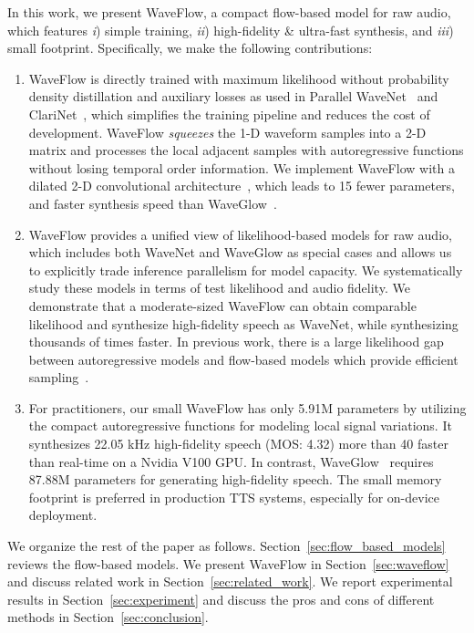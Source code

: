 \documentclass{article}
\begin{document}
In this work, we present WaveFlow, a compact flow-based model for raw audio, which features \emph{i}) simple training, \emph{ii}) high-fidelity \& ultra-fast synthesis, and \emph{iii}) small footprint. 
Specifically, we make the following contributions:
\vspace{-0.3em}
\begin{enumerate}[itemsep=-0.00pt, topsep=0pt, leftmargin=1.5em]
    \item WaveFlow is directly trained with maximum likelihood without probability density distillation and auxiliary losses as used in Parallel WaveNet~\citep{oord2017parallel} and ClariNet~\citep{ping2018clarinet}, which simplifies the training pipeline and reduces the cost of development.
     WaveFlow \emph{squeezes} the 1-D waveform samples into a 2-D matrix and processes the local adjacent samples with autoregressive functions without losing temporal order information.
    We implement WaveFlow with a dilated 2-D convolutional architecture~\citep{yu2015multi}, which leads to 15 fewer parameters, and faster synthesis speed than WaveGlow~\citep{prenger2019waveglow}. 
    \vspace{-.04cm}
    \item  WaveFlow provides a unified view of likelihood-based models for raw audio, which includes both WaveNet and WaveGlow as special cases and allows us to explicitly trade inference parallelism for model capacity.
    We systematically study these models in terms of test likelihood and audio fidelity.
    We demonstrate that a moderate-sized WaveFlow can obtain comparable likelihood and synthesize high-fidelity speech as  WaveNet, while synthesizing thousands of times faster. 
    In previous work, there is a large likelihood gap between autoregressive models and flow-based models which provide efficient sampling~\citep{ho2019flow++, tran2019discrete}.
    \vspace{-.04cm}
    \item  For practitioners, our small WaveFlow has only 5.91M parameters by utilizing the compact autoregressive functions for modeling local signal variations. It synthesizes 22.05 kHz high-fidelity speech (MOS: 4.32) more than 40 faster than real-time on a Nvidia V100 GPU. 
    In contrast, WaveGlow~\citep{prenger2019waveglow} requires  87.88M parameters for generating high-fidelity speech. 
    The small memory footprint is preferred in production TTS systems, especially for on-device deployment.
\vspace{-.2em}
\end{enumerate}
We organize the rest of the paper as follows. 
Section~\ref{sec:flow_based_models} reviews the flow-based models.
We present WaveFlow in Section~\ref{sec:waveflow} and discuss related work in Section~\ref{sec:related_work}.
We report experimental results in Section~\ref{sec:experiment} and discuss the pros and cons of different methods in Section~\ref{sec:conclusion}.
\end{document}

